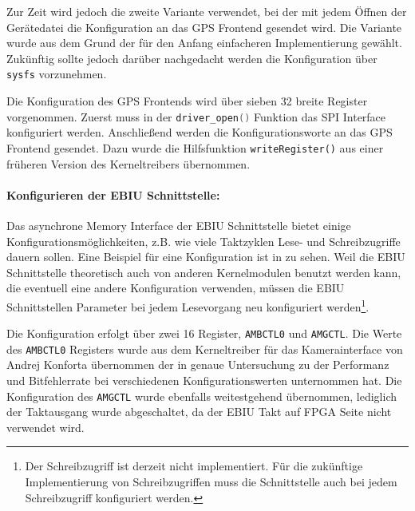 Zur Zeit wird jedoch die zweite Variante verwendet, bei der mit jedem Öffnen der Gerätedatei die Konfiguration an das GPS Frontend gesendet wird. Die Variante wurde aus dem Grund der für den Anfang einfacheren Implementierung gewählt. Zukünftig sollte jedoch darüber nachgedacht werden die Konfiguration über \lstinline$sysfs$ vorzunehmen.

Die Konfiguration des GPS Frontends wird über sieben \SI{32}{\bit} breite Register vorgenommen. Zuerst muss in der \lstinline[language=C]$driver_open()$ Funktion das SPI Interface konfiguriert werden. Anschließend werden die Konfigurationsworte an das GPS Frontend gesendet. Dazu wurde die Hilfsfunktion \lstinline$writeRegister()$ aus einer früheren Version des Kerneltreibers übernommen.


\paragraph{Konfigurieren der EBIU Schnittstelle:}
Das asynchrone Memory Interface der EBIU Schnittstelle bietet einige Konfigurationsmöglichkeiten, z.B. wie viele Taktzyklen Lese- und Schreibzugriffe dauern sollen. Eine Beispiel für eine Konfiguration ist in  zu sehen. Weil die EBIU Schnittstelle theoretisch auch von anderen Kernelmodulen benutzt werden kann, die eventuell eine andere Konfiguration verwenden, müssen die EBIU Schnittstellen Parameter bei jedem Lesevorgang neu konfiguriert werden\footnote{Der Schreibzugriff ist derzeit nicht implementiert. Für die zukünftige Implementierung von Schreibzugriffen muss die Schnittstelle auch bei jedem Schreibzugriff konfiguriert werden.}. 

Die Konfiguration erfolgt über zwei \SI{16}{\bit} Register, \lstinline$AMBCTL0$ und \lstinline$AMGCTL$. Die Werte des \lstinline$AMBCTL0$ Registers wurde aus dem Kerneltreiber für das Kamerainterface von Andrej Konforta übernommen der in \cite{DragsailAndrejMA} genaue Untersuchung zu der Performanz und Bitfehlerrate bei verschiedenen Konfigurationswerten unternommen hat. Die Konfiguration des \lstinline$AMGCTL$ wurde ebenfalls weitestgehend übernommen, lediglich der Taktausgang wurde abgeschaltet, da der EBIU Takt auf FPGA Seite nicht verwendet wird.



